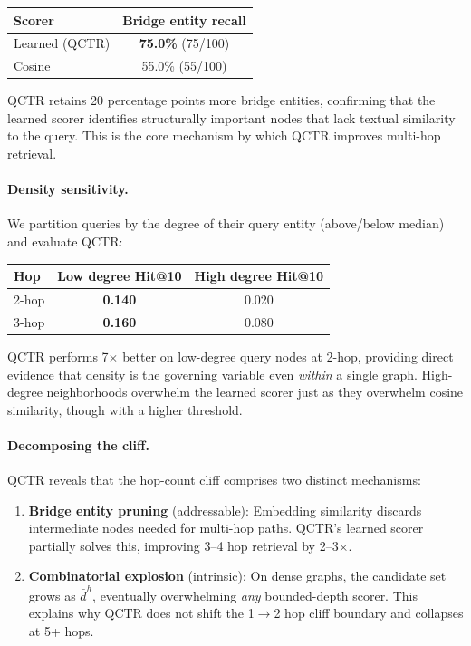 \documentclass[11pt]{article}
\begin{document}
\begin{center}
\begin{tabular}{lc}
\toprule
Scorer & Bridge entity recall \\
\midrule
Learned (QCTR) & \textbf{75.0\%} (75/100) \\
Cosine & 55.0\% (55/100) \\
\bottomrule
\end{tabular}
\end{center}

QCTR retains 20 percentage points more bridge entities, confirming that the learned scorer identifies structurally important nodes that lack textual similarity to the query. This is the core mechanism by which QCTR improves multi-hop retrieval.

\paragraph{Density sensitivity.} We partition queries by the degree of their query entity (above/below median) and evaluate QCTR:

\begin{center}
\begin{tabular}{lcc}
\toprule
Hop & Low degree Hit@10 & High degree Hit@10 \\
\midrule
2-hop & \textbf{0.140} & 0.020 \\
3-hop & \textbf{0.160} & 0.080 \\
\bottomrule
\end{tabular}
\end{center}

QCTR performs 7$\times$ better on low-degree query nodes at 2-hop, providing direct evidence that density is the governing variable even \textit{within} a single graph. High-degree neighborhoods overwhelm the learned scorer just as they overwhelm cosine similarity, though with a higher threshold.

\paragraph{Decomposing the cliff.} QCTR reveals that the hop-count cliff comprises two distinct mechanisms:
\begin{enumerate}
    \item \textbf{Bridge entity pruning} (addressable): Embedding similarity discards intermediate nodes needed for multi-hop paths. QCTR's learned scorer partially solves this, improving 3--4 hop retrieval by 2--3$\times$.
    \item \textbf{Combinatorial explosion} (intrinsic): On dense graphs, the candidate set grows as $\bar{d}^h$, eventually overwhelming \textit{any} bounded-depth scorer. This explains why QCTR does not shift the 1$\to$2 hop cliff boundary and collapses at 5+ hops.
\end{enumerate}
\end{document}
